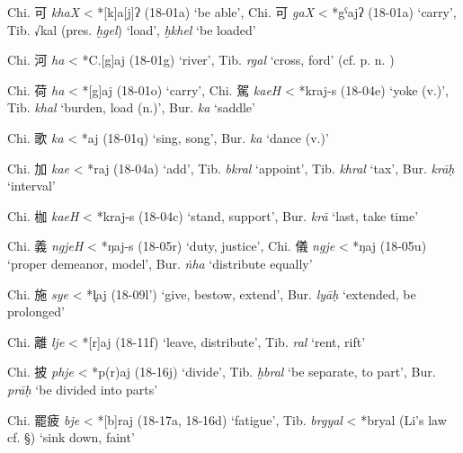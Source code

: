 \begin{description} \item
Chi. 可  \emph{khaX} \textless{} *[k]{}{}a{[}j]ʔ (18-01a) `be able',
Chi. 可  \emph{gaX} \textless{} *gˁajʔ (18-01a) `carry', Tib. √kal (pres. {} \emph{ḫgel}) `load', 
{} \emph{ḫkhel} `be loaded'

\item
Chi. 河  \emph{ha }\textless{} *C.{[}g]{}aj (18-01g) `river', Tib. {} \emph{rgal} `cross, ford' (cf. p. n. )

\item
Chi. 荷 \emph{ha }\textless{} *[g]{}aj (18-01o) `carry', Chi. 駕
 \emph{kaeH} \textless{} *kraj-s (18-04e) `yoke (v.)', Tib. {} \emph{khal} `burden, load (n.)', Bur. {} \emph{ka} `saddle'

\item
Chi. 歌 \emph{ka} \textless{} *{}aj (18-01q) `sing, song', Bur. {} \emph{ka} `dance (v.)'

\item
Chi. 加  \emph{kae }\textless{} *{}raj (18-04a) `add', Tib. {} \emph{bkral} `appoint', Tib. {} \emph{khral} `tax', Bur. {} \emph{krāḥ} `interval'

\item
Chi. 枷 \emph{kaeH} \textless{} *kraj-s (18-04c) `stand, support', Bur. {} \emph{krā} `last, take time'

\item
Chi. 義  \emph{ngjeH} \textless{} *ŋaj-s (18-05r) `duty, justice', Chi.
儀  \emph{ngje} \textless{} *ŋaj (18-05u) `proper demeanor, model', Bur. {} \emph{ṅha} `distribute equally'

\item
Chi. 施 \emph{sye} \textless{} *l̥aj (18-09l') `give, bestow, extend',
Bur. {} \emph{lyāḥ} `extended, be prolonged'

\item
Chi. 離  \emph{lje} \textless{} *[r]aj (18-11f) `leave, distribute',
Tib. {} \emph{ral} `rent, rift'

\item
Chi. 披  \emph{phje }\textless{} *p{}(r)aj (18-16j) `divide', Tib. {} \emph{ḫbral} `be separate, to part', Bur. {} \emph{prāḥ} `be divided
into parts'

\item
Chi. 罷疲  \emph{bje }\textless{} *[b]raj (18-17a, 18-16d) `fatigue',
Tib. {} \emph{brgyal} \textless{} *bryal (Li's law cf. §) `sink
down, faint'


\end{description}
